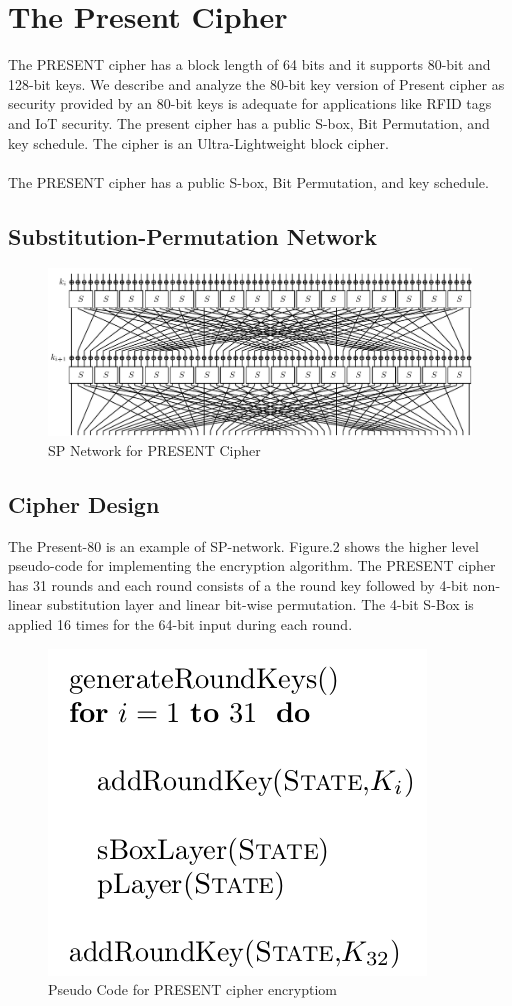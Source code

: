 \documentclass[journal=tosc,preprint]{iacrtrans}
\begin{document}
\section{The Present Cipher}
The PRESENT cipher has a block length of 64 bits and it supports 80-bit and 128-bit keys. We describe and analyze the 80-bit key version of Present cipher as security provided by an 80-bit keys is adequate for applications like RFID tags and IoT security. The present cipher has a public S-box, Bit Permutation, and key schedule. The cipher is an Ultra-Lightweight block cipher.\\\\
The PRESENT cipher has a public S-box, Bit Permutation, and key schedule.
\subsection{Substitution-Permutation Network}
\begin{figure}[H]
	\centering
	\includegraphics[width=\linewidth]{PRESENT_diagram.pdf}
	\caption{SP Network for PRESENT Cipher}
\end{figure}
\subsection{Cipher Design}
The Present-80 is an example of SP-network. Figure.2 shows the higher level pseudo-code for implementing the encryption
algorithm. The PRESENT cipher has 31 rounds and each round consists of a the round key followed by 4-bit non-linear substitution layer and linear bit-wise
permutation. The 4-bit S-Box is applied 16 times for the 64-bit input during
each round. 
\begin{figure}[h!]
	\centering
	\includegraphics[width=0.34\linewidth, height=0.15\textheight]{"Screenshot from 2021-11-06 08-28-01"}
	\caption{Pseudo Code for PRESENT cipher encryptiom}
	\label{fig:screenshot-from-2021-11-06-08-28-01}
\end{figure}\\
\end{document}
